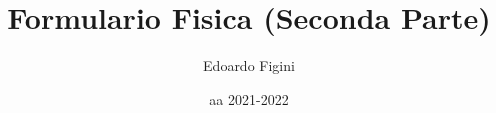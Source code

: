 \documentclass{article}
\title{Formulario Fisica (Seconda Parte)}
\author{Edoardo Figini}
\date{aa 2021-2022}
\begin{document}
\maketitle

\tableofcontents
\newpage



\vspace{\baselineskip}


\vspace{\baselineskip}

\end{document}
